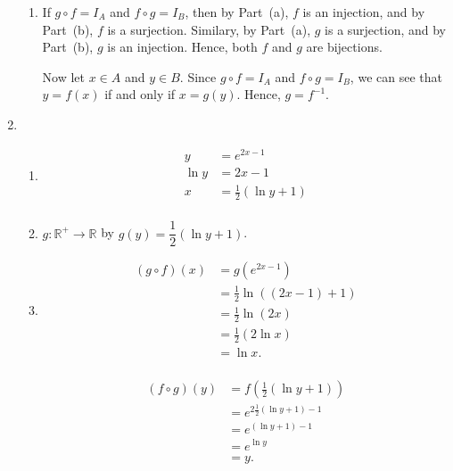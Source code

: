 \begin{enumerate}
\begin{enumerate}
\item If $g \circ f = I_A$ and $f \circ g = I_B$, then by Part~(a), $f$ is an injection, and by Part~(b), $f$ is a surjection.  Similary, by Part~(a), $g$ is a surjection, and by Part~(b), $g$ is an injection.  Hence, both $f$ and $g$ are bijections.

Now let $x \in A$ and $y \in B$.  Since $g \circ f = I_A$ and $f \circ g = I_B$, we can see that 
$y = f \left( x \right)$ if and only if $x = g \left( y \right)$.  Hence, $g = f^{-1}$. 
\end{enumerate}



\item \begin{enumerate}
\item 
\[
\begin{aligned}
y &= e^{2x - 1} \\
\ln y &= 2x - 1 \\
x &= \frac{1}{2}\left( \ln y + 1 \right)\\
\end{aligned}
\]

\item $g: \mathbb{R}^+ \to \mathbb{R}$ by 
$g \left( y \right) = \dfrac{1}{2}\left( \ln y + 1 \right)$.

\item \begin{multicols}{2}
\[
\begin{aligned}
\left( g \circ f \right) \left( x \right) &= g \left( e^{2x-1} \right) \\
                               &= \frac{1}{2} \ln \left( \left( 2x - 1 \right) + 1 \right) \\ 
                               &= \frac{1}{2} \ln \left( 2x \right) \\
                               &= \frac{1}{2} \left( 2 \ln x \right) \\
                               &= \ln{x}.\\
\end{aligned}
\]

\[
\begin{aligned}
\left( f \circ g \right) \left( y \right) &= f \left( \frac{1}{2} \left( \ln y + 1 \right)\right) \\
                         &= e^{2 \frac{1}{2} \left( \ln y + 1 \right) - 1} \\
                         &= e^{\left( \ln y + 1 \right) - 1 } \\
                         &= e^{\ln y} \\
                         &= y. \\
\end{aligned}
\]
\end{multicols}


\end{enumerate}
\end{enumerate}
